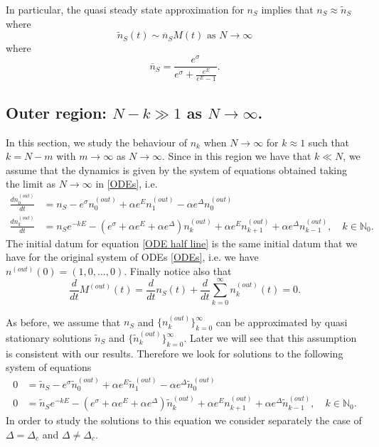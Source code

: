 \documentclass{article}
\numberwithin{equation}{section}
\theoremstyle{plain}
\begin{document}
In particular, the quasi steady state approximation for $n_S $ implies that $n_S \approx \tilde{n}_S $ where 
\[
\tilde{n}_S(t) \sim  \overline n_S  M(t) \text{ as } N \to \infty
\]
where 
\begin{equation} \label{overline nS}
 \overline n_S = \frac{e^\sigma }{ e^\sigma + \frac{e^E}{e^E-1}}.
\end{equation}


\subsection{Outer region: $N - k  \gg 1 $ as $N \to \infty$.}
In this section, we study the behaviour of $n_k$ when $N \to \infty$ for $k \approx 1$ such that $ k = N-m$  with $m \to \infty $ as $N \to \infty$. 
Since in this region we have that $k \ll N $, we assume that the dynamics  is given by the system of equations obtained taking the limit as $N \to \infty $ in \eqref{ODEs}, i.e. 
\begin{align} \label{ODE half line}
    \frac{d n_0^{(out)} }{dt} &= n_S  - e^{\sigma } n_0^{(out)} + \alpha e^E n_1^{(out)} - \alpha e^{\Delta} n_0^{(out)} \\
        \frac{d n_k^{(out)} }{dt} &= n_S e^{- k E} - \left( e^{\sigma } + \alpha e^E + \alpha e^\Delta  \right)  n_k^{(out)} + \alpha e^E n_{k+1}^{(out)}  + \alpha e^{\Delta} n_{k-1}^{(out)}, \quad k \in \mathbb N_0.   \nonumber
\end{align}
The initial datum for equation \eqref{ODE half line} is the same initial datum that we have for the original system of ODEs \eqref{ODEs}, i.e. we have $n^{(out)}(0)=(1, 0, \dots, 0)$. Finally notice also that 
\[
\frac{d}{dt} M^{(out)}(t)=\frac{d}{dt} n_S(t) +  \frac{d}{dt} \sum_{k=0}^\infty n_k^{(out)}(t) = 0. 
\]

 As before, we assume that $n_S$ and $ \{ n^{(out)}_k \}_{ k=0}^\infty $ can be approximated by quasi stationary solutions $\tilde{n}_S$ and $ \{ \tilde{n}^{(out)}_k \}_{ k=0}^\infty $. 
Later we will see that this assumption is consistent with our results. 
Therefore we look for solutions to the following system of equations
\begin{align} \label{ODE half line stationary}
   0 &= \tilde{n}_S - e^{\sigma } \tilde{n}_0^{(out)} + \alpha e^E \tilde{n}_1^{(out)} - \alpha e^{\Delta} \tilde{n}_0^{(out)}  \\
        0 &= \tilde{n}_S e^{- k E} - \left( e^{\sigma } + \alpha e^E + \alpha e^\Delta  \right)  \tilde{n}_k^{(out)} + \alpha e^E n_{k+1}^{(out)}  + \alpha e^{\Delta} \tilde{n}_{k-1}^{(out)}, \quad k \in \mathbb N_0. \label{ODE half line stationary2}
\end{align}
In order to study the solutions to this equation we consider separately the case of $\Delta = \Delta_c $ and $\Delta \neq \Delta_c$. 
\end{document}
